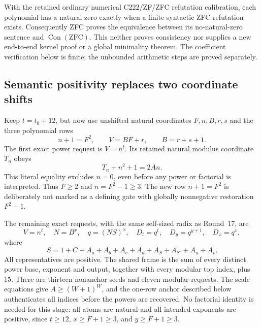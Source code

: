 With the retained ordinary numerical C222/ZF/ZFC refutation calibration,
each polynomial has a natural zero exactly when a finite syntactic ZFC
refutation exists. Consequently ZFC proves the equivalence between its
no-natural-zero sentence and \(\operatorname{Con}(\mathrm{ZFC})\).
This neither proves consistency nor supplies a new end-to-end kernel
proof or a global minimality theorem. The coefficient verification below
is finite; the unbounded arithmetic steps are proved separately.

\subsection{Semantic positivity replaces two coordinate shifts}
Keep \(t=t_0+12\), but now use unshifted natural coordinates \(F,n,B,r,s\)
and the three polynomial rows
\begin{equation}\label{eq:sf-certificate}
 n+1=F^2,\qquad V=BF+r,\qquad B=r+s+1.
\end{equation}
The first exact power request is \(V=n^t\). Its retained natural modulus
coordinate \(T_n\) obeys
\[
 T_n+n^2+1=2An.
\]
This literal equality excludes \(n=0\), even before any power or factorial
is interpreted. Thus \(F\ge2\) and \(n=F^2-1\ge3\).
The new row \(n+1=F^2\) is deliberately not marked as a defining gate
with globally nonnegative restoration \(F^2-1\).

The remaining exact requests, with the same self-sized radix as Round~17,
are
\begin{equation}\label{eq:sf-powers}
 V=n^t,\quad N=B^x,\quad q=(NS)^x,\quad
 D_t=q^t,\quad D_y=q^{y+1},\quad D_x=q^x,
\end{equation}
where
\[
 S=1+C+A_a+A_b+A_c+A_d+A_S+A_{S'}+A_u+A_v.
\]
All representatives are positive. The shared frame is the sum of every
distinct power base, exponent and output, together with every modular top
index, plus 15. There are thirteen nonanchor seeds and eleven modular
requests. The scale equations give \(A\ge(W+1)^W\), and the one-row
anchor described below authenticates all indices before the powers are
recovered. No factorial identity is needed for this stage: all atoms are
natural and all intended exponents are positive, since \(t\ge12\),
\(x\ge F+1\ge3\), and \(y\ge F+1\ge3\).


